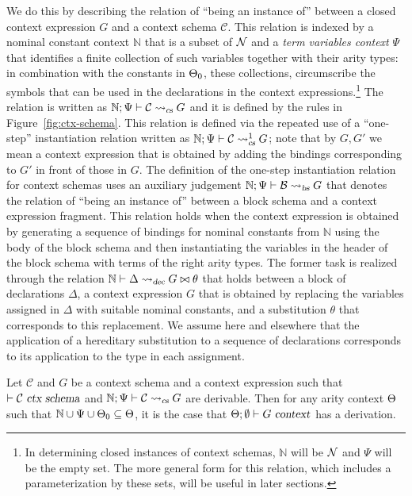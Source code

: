We do this by describing the relation of ``being an instance of''
between a closed context expression $G$ and a context schema $\mathcal{C}$.
%
This relation is indexed by a nominal constant context $\mathbb{N}$
that is a subset of $\mathcal{N}$ and a \emph{term variables context} $\Psi$
that identifies a finite collection of such variables together with their
arity types: in combination with  the constants in $\Theta_0$,
these collections, circumscribe the symbols that can be used in the
declarations in the context expressions.\footnote{In  
  determining closed instances of context schemas, $\mathbb{N}$ will
  be $\mathcal{N}$ and $\Psi$ will be the empty set. The more general form
  for this relation, which includes a parameterization by these sets,
  will be useful in later sections.} 
The relation is written as $\mathbb{N} ; \Psi \vdash \mathcal{C} \leadsto_{\mbox{\sl \scriptsize cs}} G$
and it is defined by the rules in Figure~\ref{fig:ctx-schema}.
%
This relation is defined via the repeated use of a ``one-step''
instantiation relation written as
$\mathbb{N} ; \Psi \vdash \mathcal{C} \leadsto^1_{\mbox{\sl \scriptsize cs}} G$; note that by $G, G'$
we mean a context expression that is obtained by adding the bindings
corresponding to $G'$ in front of those in $G$.
%
The definition of the one-step instantiation relation for context
schemas uses an auxiliary judgement
$\mathbb{N} ; \Psi \vdash \mathcal{B} \leadsto_{\mbox{\sl \scriptsize bs}} G$ that denotes the relation
of ``being an instance of'' between a block 
schema and a context expression fragment.
%
This relation holds when the context expression is obtained by
generating a sequence of bindings for nominal constants from
$\mathbb{N}$ using the body of the block schema and then instantiating
the variables in the header of the block schema with terms of the
right arity types.
%
The former task is realized through the relation
$\mathbb{N} \vdash \Delta \leadsto_{\mbox{\sl \scriptsize dec}} G \bowtie \theta$ that holds between a block of
declarations $\Delta$, a context expression $G$ that is obtained
by replacing the variables assigned in $\Delta$ with
suitable nominal constants, and a substitution $\theta$ that
corresponds to this replacement.
%
We assume here and elsewhere that the application of a hereditary
substitution to a sequence of declarations  corresponds to its
application to the type in each assignment. 

\begin{theorem}\label{th:schemainst}
Let $\mathcal{C}$ and $G$ be a context schema and a context expression
such that $\vdash \mathcal{C}\ \mbox{\sl ctx schema}$ and
$\mathbb{N} ; \Psi \vdash \mathcal{C} \leadsto_{\mbox{\sl \scriptsize cs}} G$ are derivable. Then for
any arity context $\Theta$ such that
$\mathbb{N} \cup \Psi \cup \Theta_0 \subseteq \Theta$, it is the case that 
$\Theta;\emptyset \vdash G\ \mbox{\sl context}$ has a derivation. 
\end{theorem}

